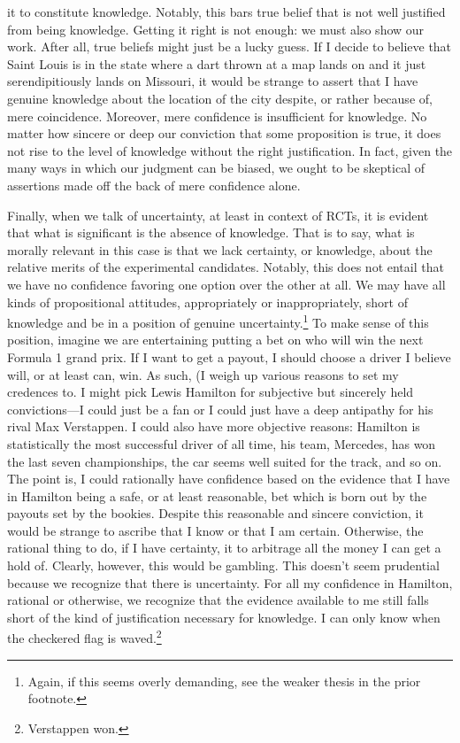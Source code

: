 \documentclass[letterpaper,notitlepage,12pt]{article}
\begin{document}
it to constitute knowledge.
Notably, this bars true belief that is not well justified from being knowledge.
Getting it right is not enough: we must also show our work.
After all, true beliefs might just be a lucky guess.
If I decide to believe that Saint Louis is in the state where a dart thrown at a
map lands on and it just serendipitiously lands on Missouri, it would be strange
to assert that I have genuine knowledge about the location of the city despite,
or rather because of, mere coincidence.
Moreover, mere confidence is insufficient for knowledge.
No matter how sincere or deep our conviction that some proposition is true, it
does not rise to the level of knowledge without the right justification.
In fact, given the many ways in which our judgment can be biased, we ought to
be skeptical of assertions made off the back of mere confidence alone.

Finally, when we talk of uncertainty, at least in context of RCTs, it is evident
that what is significant is the absence of knowledge.
That is to say, what is morally relevant in this case is that we lack certainty,
or knowledge, about the relative merits of the experimental candidates.
Notably, this does not entail that we have no confidence favoring one option
over the other at all.
We may have all kinds of propositional attitudes, appropriately or
inappropriately, short of knowledge and be in a position of genuine
uncertainty.\footnote{Again, if this seems overly demanding, see the weaker
thesis in the prior footnote.}
To make sense of this position, imagine we are entertaining putting a bet on who
will win the next Formula 1 grand prix.
If I want to get a payout, I should choose a driver I believe will, or at least
can, win.
As such, (I weigh up various reasons to set my credences to.
I might pick Lewis Hamilton for subjective but sincerely held convictions---I
could just be a fan or I could just have a deep antipathy for his rival Max
Verstappen.
I could also have more objective reasons: Hamilton is statistically the most
successful driver of all time, his team, Mercedes, has won the last seven
championships, the car seems well suited for the track, and so on.
The point is, I could rationally have confidence based on the evidence that I
have in Hamilton being a safe, or at least reasonable, bet which is born out by
the payouts set by the bookies.
Despite this reasonable and sincere conviction, it would be strange to ascribe
that I know or that I am certain. 
Otherwise, the rational thing to do, if I have certainty, it to arbitrage all
the money I can get a hold of.
Clearly, however, this would be gambling.
This doesn't seem prudential because we recognize that there is uncertainty.
For all my confidence in Hamilton, rational or otherwise, we recognize that the
evidence available to me still falls short of the kind of justification
necessary for knowledge.
I can only know when the checkered flag is waved.\footnote{Verstappen won.}
\end{document}
